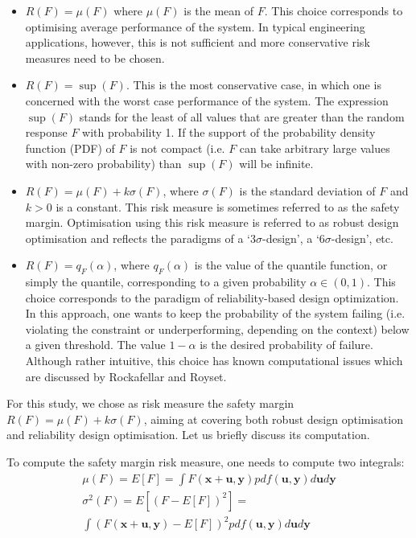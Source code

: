 \documentclass[10pt,twocolumn,a4paper]{article}
\begin{document}
\begin{itemize}
  \item $R(F)=\mu(F)$ where $\mu(F)$ is the mean of $F$. This choice corresponds to optimising average performance of the system. In typical engineering applications, however, this is not sufficient and more conservative risk measures need to be chosen.
  \item $R(F)=\sup(F)$. This is the most conservative case, in which one is concerned with the worst case performance of the system. The expression $\sup(F)$ stands for the least of all values that are greater than the random response $F$ with probability 1. If the support of the probability density function (PDF) of $F$ is not compact (i.e. $F$ can take arbitrary large values with non-zero probability) than $\sup(F)$ will be infinite.
  \item $R(F)=\mu(F)+k\sigma(F)$, where $\sigma(F)$ is the standard deviation of $F$ and $k>0$ is a constant. This risk measure is sometimes referred to as the safety margin. Optimisation using this risk measure is referred to as robust design optimisation\cite{KochYangGu2004,Yao2011,ZhangZhuChenArendt2013} and reflects the paradigms of a ‘$3\sigma$-design’, a ‘$6\sigma$-design’, etc.
  \item $R(F)=q_F(\alpha)$, where $q_F(\alpha)$ is the value of the quantile function, or simply the quantile, corresponding to a given probability $\alpha\in (0,1)$. This choice corresponds to the paradigm of reliability-based design optimization\cite{AouesChateauneuf2010,Yao2011,YounChoi2004}. In this approach, one wants to keep the probability of the system failing (i.e. violating the constraint or underperforming, depending on the context) below a given threshold. The value $1-\alpha$ is the desired probability of failure. Although rather intuitive, this choice has known computational issues which are discussed by Rockafellar and Royset\cite{RockafellarRoyset2010}.
\end{itemize}

For this study, we chose as risk measure the safety margin $R(F)=\mu(F)+k\sigma(F)$, aiming at covering both robust design optimisation and reliability design optimisation. Let us briefly discuss its computation.

To compute the safety margin risk measure, one needs to compute two integrals:
\begin{displaymath}
  \begin{array}{c}
    \mu (F)=E[F]=\int F(\pmb x + \pmb u, \pmb y)p df(\pmb u, \pmb y)d\pmb u d\pmb y \\
    \sigma^2(F)=E[(F-E[F])^2]=\\\int(F(\pmb x + \pmb u, \pmb y)-E[F])^2 p df(\pmb u, \pmb y)d\pmb u d\pmb y
  \end{array}
\end{displaymath}
\end{document}
